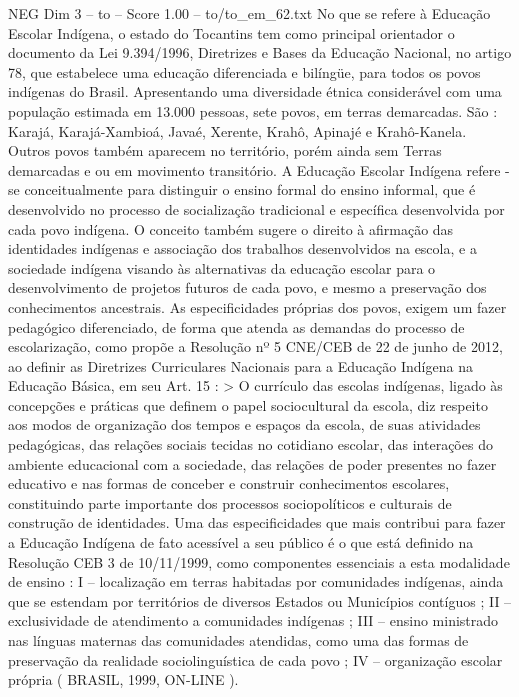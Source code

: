 \begin{textsample}{NEG Dim 3 – to – Score 1.00 – to/to\_em\_62.txt}  \label{ex:f3_neg_187}
No que se refere à Educação Escolar Indígena, o estado do Tocantins tem como principal orientador o documento da Lei 9.394/1996, Diretrizes e Bases da Educação Nacional, no artigo 78, que estabelece uma educação diferenciada e bilíngüe, para todos os povos indígenas do Brasil.
Apresentando uma diversidade étnica considerável com uma população estimada em 13.000 pessoas, sete povos, em terras demarcadas.
São : Karajá, Karajá-Xambioá, Javaé, Xerente, Krahô, Apinajé e Krahô-Kanela.
Outros povos também aparecem no território, porém ainda sem Terras demarcadas e ou em movimento transitório.
A Educação Escolar Indígena refere -se conceitualmente para distinguir o ensino formal do ensino informal, que é desenvolvido no processo de socialização tradicional e específica desenvolvida por cada povo indígena.
O conceito também sugere o direito à afirmação das identidades indígenas e associação dos trabalhos desenvolvidos na escola, e a sociedade indígena visando às alternativas da educação escolar para o desenvolvimento de projetos futuros de cada povo, e mesmo a preservação dos conhecimentos ancestrais.
As especificidades próprias dos povos, exigem um fazer pedagógico diferenciado, de forma que atenda as demandas do processo de escolarização, como propõe a Resolução nº 5 CNE/CEB de 22 de junho de 2012, ao definir as Diretrizes Curriculares Nacionais para a Educação Indígena na Educação Básica, em seu Art. 15 : > O currículo das escolas indígenas, ligado às concepções e práticas que definem o papel sociocultural da escola, diz respeito aos modos de organização dos tempos e espaços da escola, de suas atividades pedagógicas, das relações sociais tecidas no cotidiano escolar, das interações do ambiente educacional com a sociedade, das relações de poder presentes no fazer educativo e nas formas de conceber e construir conhecimentos escolares, constituindo parte importante dos processos sociopolíticos e culturais de construção de identidades.
Uma das especificidades que mais contribui para fazer a Educação Indígena de fato acessível a seu público é o que está definido na Resolução CEB 3 de 10/11/1999, como componentes essenciais a esta modalidade de ensino : I – localização em terras habitadas por comunidades indígenas, ainda que se estendam por territórios de diversos Estados ou Municípios contíguos ; II – exclusividade de atendimento a comunidades indígenas ; III – ensino ministrado nas línguas maternas das comunidades atendidas, como uma das formas de preservação da realidade sociolinguística de cada povo ; IV – organização escolar própria ( BRASIL, 1999, ON-LINE ).

\end{textsample}
